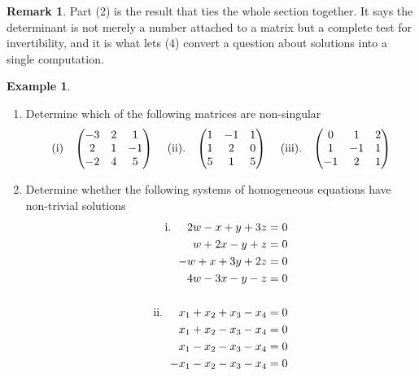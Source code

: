 \documentclass[11pt,a4paper]{article}
\theoremstyle{definition}
\newtheorem{exa}[thm]{Example}
\newtheorem*{remark}{Remark}
\begin{document}
\begin{remark}
Part (2) is the result that ties the whole section together. It says the
determinant is not merely a number attached to a matrix but a complete test for
invertibility, and it is what lets (4) convert a question about solutions into
a single computation.
\end{remark}


\begin{exa}
\begin{enumerate}
\item Determine which of the following matrices are non-singular $$\text{(i)}\hspace{0.3cm}
\begin{pmatrix}
-3&2&1\\2&1&-1\\-2&4&5\\
\end{pmatrix}
\hspace{0.4cm}\text{(ii)}.\hspace{0.3cm}
\begin{pmatrix}
1&-1&1\\1&2&0\\5&1&5\\
\end{pmatrix}
\hspace{0.4cm}\text{(iii).}\hspace{0.3cm}
\begin{pmatrix}
0&1&2\\1&-1&1\\-1&2&1\\
\end{pmatrix}
$$
\item Determine whether the following systems of homogeneous equations have non-trivial solutions
\begin{align*}
\text{i.}\hspace{0.5cm} 2w-x+y+3z &=0\\ w+2x-y+z&=0\\ -w+x+3y+2z&=0\\4w-3x-y-z&=0\\\\
\text{ii.}\hspace{0.5cm} x_1+x_2+x_3-x_4&=0\\x_1+x_2-x_3-x_4&=0\\x_1-x_2-x_3-x_4&=0\\-x_1-x_2-x_3-x_4&=0\\
\end{align*}
\end{enumerate}
\end{exa}
\end{document}
